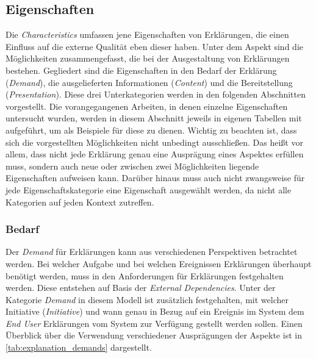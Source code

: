 \subsection{Eigenschaften}

Die \textit{Characteristics} umfassen jene Eigenschaften von Erklärungen, die einen Einfluss auf die externe Qualität eben dieser haben. Unter dem Aspekt sind die Möglichkeiten zusammengefasst, die bei der Ausgestaltung von Erklärungen bestehen. Gegliedert sind die Eigenschaften in den Bedarf der Erklärung (\textit{Demand}), die ausgelieferten Informationen (\textit{Content}) und die Bereitstellung (\textit{Presentation}). Diese drei Unterkategorien werden in den folgenden Abschnitten vorgestellt. Die vorangegangenen Arbeiten, in denen einzelne Eigenschaften untersucht wurden, werden in diesem Abschnitt jeweils in eigenen Tabellen mit aufgeführt, um als Beispiele für diese zu dienen. Wichtig zu beachten ist, dass sich die vorgestellten Möglichkeiten nicht unbedingt ausschließen. Das heißt vor allem, dass nicht jede Erklärung genau eine Ausprägung eines Aspektes erfüllen muss, sondern auch neue oder zwischen zwei Möglichkeiten liegende Eigenschaften aufweisen kann. Darüber hinaus muss auch nicht zwangsweise für jede Eigenschaftskategorie eine Eigenschaft ausgewählt werden, da nicht alle Kategorien auf jeden Kontext zutreffen.

\subsubsection{Bedarf}

Der \textit{Demand}  für Erklärungen kann aus verschiedenen Perspektiven betrachtet werden. Bei welcher Aufgabe und bei welchen Ereignissen Erklärungen überhaupt benötigt werden, muss in den Anforderungen für Erklärungen festgehalten werden. Diese entstehen auf Basis der \textit{External Dependencies}. Unter der Kategorie \textit{Demand} in diesem Modell ist zusätzlich festgehalten, mit welcher Initiative (\textit{Initiative}) und wann genau in Bezug auf ein Ereignis im System dem \textit{End User} Erklärungen vom System zur Verfügung gestellt werden sollen. Einen Überblick über die Verwendung verschiedener Ausprägungen der Aspekte ist in \autoref{tab:explanation_demands} dargestellt.

